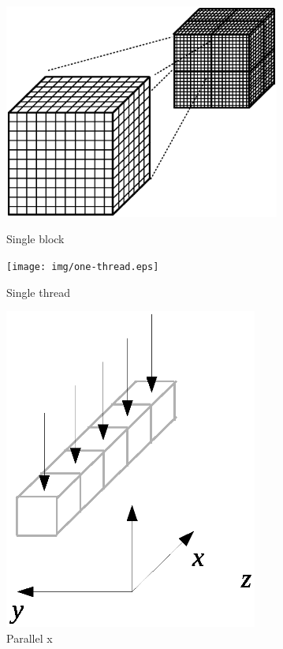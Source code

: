 \documentclass{article}
\begin{document}
\begin{figure}[ht]
\begin{minipage}[b]{0.45\linewidth}
\centering
\includegraphics[trim={{50pt} {150pt} {50pt} {150pt}}, clip, height=200pt]{img/one-block.eps}
\caption{Single block}
\label{fig:one-block}
\end{minipage}
\hspace{0.5cm}
\begin{minipage}[b]{0.45\linewidth}
\centering
\texttt{[image: img/one-thread.eps]}
\caption{Single thread}
\label{fig:one-line}
\end{minipage}
\end{figure}




\begin{figure}[h]
\begin{center}
\includegraphics[trim={{100pt} {150pt} {100pt} {150pt}}, clip, height=300pt]{img/parallel-x.eps}
\end{center}
\caption{Parallel x}
\label{fig:parallel-x}
\end{figure}
\end{document}
